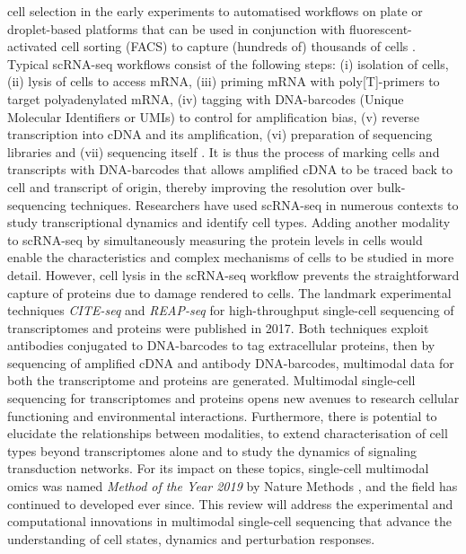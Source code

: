 \documentclass[times, twoside, watermark]{zHenriquesLab-StyleBioRxiv}
\begin{document}
cell selection in the early experiments to automatised workflows on plate or droplet-based platforms that can be used in conjunction with fluorescent-activated cell sorting (FACS) to capture (hundreds of) thousands of cells \cite{Svensson2018}. \newline Typical scRNA-seq workflows consist of the following steps: (i) isolation of cells, (ii) lysis of cells to access mRNA, (iii) priming mRNA with poly[T]-primers to target polyadenylated mRNA, (iv) tagging with DNA-barcodes (Unique Molecular Identifiers or UMIs) to control for amplification bias, (v) reverse transcription into cDNA and its amplification, (vi) preparation of sequencing libraries and (vii) sequencing itself \cite{Haque2017}. It is thus the process of marking cells and transcripts with DNA-barcodes that allows amplified cDNA to be traced back to cell and transcript of origin, thereby improving the resolution over bulk-sequencing techniques. \newline Researchers have used scRNA-seq in numerous contexts to study transcriptional dynamics and identify cell types. Adding another modality to scRNA-seq by simultaneously measuring the protein levels in cells would enable the characteristics and complex mechanisms of cells to be studied in more detail. However, cell lysis in the scRNA-seq workflow prevents the straightforward capture of proteins due to damage rendered to cells. The landmark experimental techniques \textit{CITE-seq} \cite{Stoeckius2017} and \textit{REAP-seq} \cite{Peterson2017} for high-throughput single-cell sequencing of transcriptomes and proteins were published in 2017. Both techniques exploit antibodies conjugated to DNA-barcodes to tag extracellular proteins, then by sequencing of amplified cDNA and antibody DNA-barcodes, multimodal data for both the transcriptome and proteins are generated. \newline Multimodal single-cell sequencing for transcriptomes and proteins opens new avenues to research cellular functioning and environmental interactions. Furthermore, there is potential to elucidate the relationships between modalities, to extend characterisation of cell types beyond transcriptomes alone and to study the dynamics of signaling transduction networks. For its impact on these topics, single-cell multimodal omics was named \textit{Method of the Year 2019} by Nature Methods \cite{NatMethOTY2019}, and the field has continued to developed ever since. This review will address the experimental and computational innovations in multimodal single-cell sequencing that advance the understanding of cell states, dynamics and perturbation responses.
\end{document}
